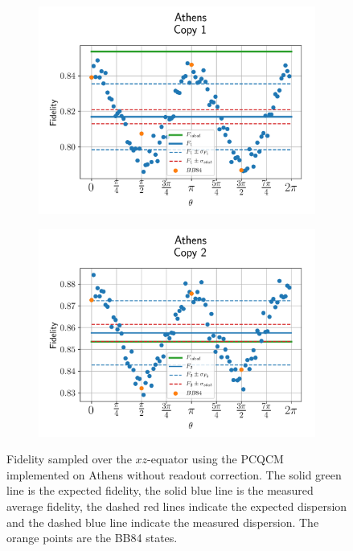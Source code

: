   \begin{figure}[H]
    \centering
    \begin{subfigure}{.5\textwidth}
      \centering
      \includegraphics[width=\textwidth]{Figures/PhaseCovariant/IBM/OnlyEquator/results_athens_copy1.png}
      \label{fig:pc_uncorrected_athens_equator_1}
    \end{subfigure}%
    \begin{subfigure}{.5\textwidth}
      \centering
      \includegraphics[width=\textwidth]{Figures/PhaseCovariant/IBM/OnlyEquator/results_athens_copy2.png}
      \label{fig:pc_uncorrected_athens_equator_2}
    \end{subfigure}
    \vspace{-0.5cm}
    \caption{Fidelity sampled over the $xz$-equator using the PCQCM implemented on Athens without readout correction. The solid green line is the expected fidelity, the solid blue line is the measured average fidelity, the dashed red lines indicate the expected dispersion and the dashed blue line indicate the measured dispersion. The orange points are the BB84 states.}
    \label{fig:pc_uncorrected_athens_equator}
  \end{figure}
  
